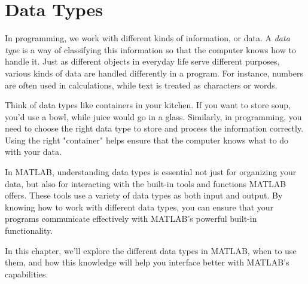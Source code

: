 \chapter{Data Types}
\label{c:datatypes}


In programming, we work with different kinds of information, or data. A \emph{data type} is a way of classifying this information so that the computer knows how to handle it. Just as different objects in everyday life serve different purposes, various kinds of data are handled differently in a program. For instance, numbers are often used in calculations, while text is treated as characters or words.

Think of data types like containers in your kitchen. If you want to store soup, you’d use a bowl, while juice would go in a glass. Similarly, in programming, you need to choose the right data type to store and process the information correctly. Using the right "container" helps ensure that the computer knows what to do with your data.

In MATLAB, understanding data types is essential not just for organizing your data, but also for interacting with the built-in tools and functions MATLAB offers. These tools use a variety of data types as both input and output. By knowing how to work with different data types, you can ensure that your programs communicate effectively with MATLAB’s powerful built-in functionality.

In this chapter, we'll explore the different data types in MATLAB, when to use them, and how this knowledge will help you interface better with MATLAB's capabilities.